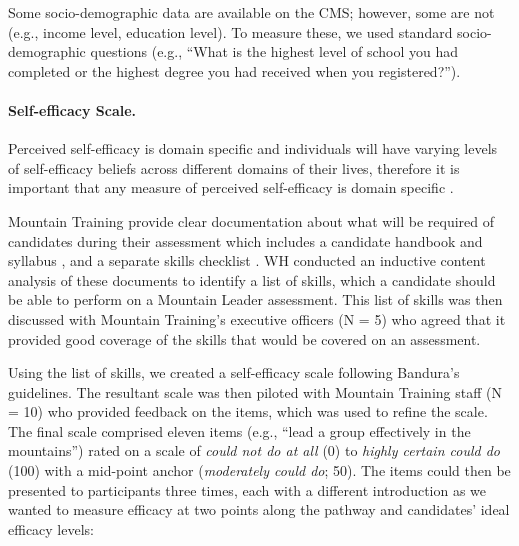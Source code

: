 \documentclass[
  12pt,
  a4paper,
]{book}
\begin{document}
Some socio-demographic data are available on the CMS; however, some are not (e.g., income level, education level). To measure these, we used standard socio-demographic questions (e.g., ``What is the highest level of school you had completed or the highest degree you had received when you registered?'').

\hypertarget{self-efficacy-scale.}{%
\paragraph{Self-efficacy Scale.}\label{self-efficacy-scale.}}

Perceived self-efficacy is domain specific and individuals will have varying levels of self-efficacy beliefs across different domains of their lives, therefore it is important that any measure of perceived self-efficacy is domain specific \citep{Bandura1997, Bandura2006}.

Mountain Training provide clear documentation about what will be required of candidates during their assessment which includes a candidate handbook and syllabus \citep{MountainTrainingUK2015a}, and a separate skills checklist \citep{MountainTrainingUK2015}. WH conducted an inductive content analysis \citep{Cho2014} of these documents to identify a list of skills, which a candidate should be able to perform on a Mountain Leader assessment. This list of skills was then discussed with Mountain Training's executive officers (N = 5) who agreed that it provided good coverage of the skills that would be covered on an assessment.

Using the list of skills, we created a self-efficacy scale following Bandura's \citeyearpar{Bandura2006} guidelines. The resultant scale was then piloted with Mountain Training staff (N = 10) who provided feedback on the items, which was used to refine the scale. The final scale comprised eleven items (e.g., ``lead a group effectively in the mountains'') rated on a scale of \emph{could not do at all} (0) to \emph{highly certain could do} (100) with a mid-point anchor (\emph{moderately could do}; 50). The items could then be presented to participants three times, each with a different introduction as we wanted to measure efficacy at two points along the pathway and candidates' ideal efficacy levels:
\end{document}
